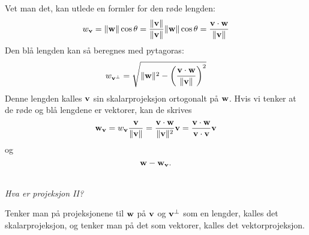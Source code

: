 Vet man det, kan utlede en formler for den røde lengden:
\[
w_{\mathbf{v}}=\|\mathbf{w}\| \cos \theta=\frac{\|\mathbf{v}\|}{\|\mathbf{v}\|} \|\mathbf{w}\| \cos \theta =\frac{\mathbf{v} \cdot \mathbf{w}}{\|\mathbf{v}\|}
\]
Den blå lengden kan så beregnes med pytagoras:
\[
w_{\mathbf{v}^{\perp}}=\sqrt{\|\mathbf{w}\|^2-\left(\frac{\mathbf{v} \cdot \mathbf{w}}{\|\mathbf{v}\|}\right)^2}
\]
Denne lengden kalles $\mathbf{v}$ sin skalarprojeksjon ortogonalt på $\mathbf{w}$. Hvis vi tenker at de røde og blå lengdene er vektorer, kan de skrives
\[
\mathbf{w}_{\mathbf{v}}=w_{\mathbf{v}}\frac{\mathbf{v}}{\|\mathbf{v}\|}=\frac{\mathbf{v} \cdot \mathbf{w}}{\|\mathbf{v}\|^2}\mathbf{v}=\frac{\mathbf{v} \cdot \mathbf{w}}{\mathbf{v} \cdot \mathbf{v}}\mathbf{v}
\]
og
\[
\mathbf{w} - \mathbf{w}_{\mathbf{v}}.
\]
 \begin{center}
\\
{\small \textit{Hva er projeksjon II?}}
\end{center}
Tenker man på projeksjonene til $\mathbf{w}$ på $\mathbf{v}$ og $\mathbf{v}^{\perp}$ som en lengder, 
kalles det skalarprojeksjon, 
og tenker man på det som vektorer, kalles det vektorprojeksjon. 

